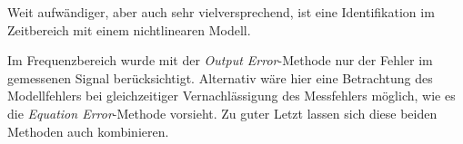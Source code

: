 Weit aufwändiger, aber auch sehr vielversprechend, ist eine Identifikation im Zeitbereich mit einem nichtlinearen 
Modell.

Im Frequenzbereich wurde mit der \textit{Output Error}-Methode nur der Fehler im gemessenen Signal berücksichtigt. Alternativ 
wäre hier eine Betrachtung des Modellfehlers bei gleichzeitiger Vernachlässigung des Messfehlers möglich, wie es die 
\textit{Equation Error}-Methode vorsieht. Zu guter Letzt lassen sich diese beiden Methoden auch kombinieren.


